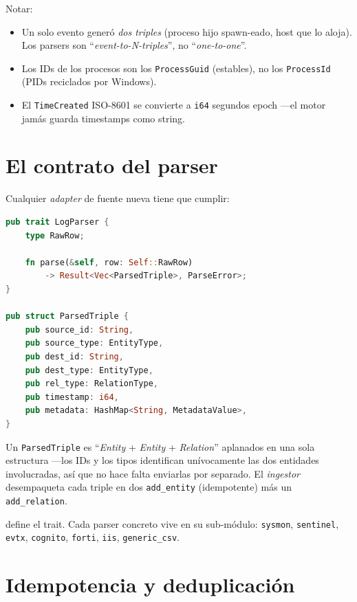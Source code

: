 \begin{ejemplo}
Notar:
\begin{itemize}
    \item Un solo evento generó \emph{dos triples} (proceso hijo
    spawn-eado, host que lo aloja). Los parsers son ``\emph{event-to-N-triples}'',
    no ``\emph{one-to-one}''.
    \item Los IDs de los procesos son los \texttt{ProcessGuid}
    (estables), no los \texttt{ProcessId} (PIDs reciclados por
    Windows).
    \item El \texttt{TimeCreated} ISO-8601 se convierte a
    \texttt{i64} segundos epoch ---el motor jamás guarda timestamps
    como string.
\end{itemize}
\end{ejemplo}

\section{El contrato del parser}

Cualquier \emph{adapter} de fuente nueva tiene que cumplir:

\begin{lstlisting}[language=Rust]
pub trait LogParser {
    type RawRow;

    fn parse(&self, row: Self::RawRow)
        -> Result<Vec<ParsedTriple>, ParseError>;
}

pub struct ParsedTriple {
    pub source_id: String,
    pub source_type: EntityType,
    pub dest_id: String,
    pub dest_type: EntityType,
    pub rel_type: RelationType,
    pub timestamp: i64,
    pub metadata: HashMap<String, MetadataValue>,
}
\end{lstlisting}

\noindent
Un \texttt{ParsedTriple} es ``\emph{Entity} + \emph{Entity} +
\emph{Relation}'' aplanados en una sola estructura ---los IDs y los
tipos identifican unívocamente las dos entidades involucradas, así
que no hace falta enviarlas por separado. El \emph{ingestor}
desempaqueta cada triple en dos \texttt{add\_entity} (idempotente)
más un \texttt{add\_relation}.

\begin{enelcodigo}
 define el trait. Cada parser
concreto vive en su sub-módulo: \texttt{sysmon}, \texttt{sentinel},
\texttt{evtx}, \texttt{cognito}, \texttt{forti}, \texttt{iis},
\texttt{generic\_csv}.
\end{enelcodigo}

\section{Idempotencia y deduplicación}

